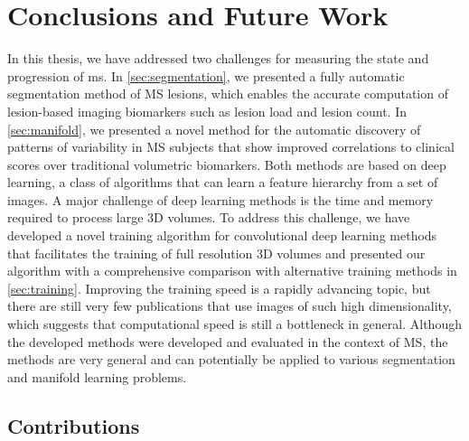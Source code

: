 \chapter{Conclusions and Future Work}
\label{sec:conclusions}

In this thesis, we have addressed two challenges for measuring the state and
progression of \gls{ms}. In \ref{sec:segmentation}, we presented a fully
automatic segmentation method of MS lesions, which enables the accurate
computation of lesion-based imaging biomarkers such as lesion load and lesion
count. In \ref{sec:manifold}, we presented a novel method for the automatic
discovery of patterns of variability in MS subjects that show improved
correlations to clinical scores over traditional volumetric biomarkers. Both
methods are based on deep learning, a class of algorithms that can learn a
feature hierarchy from a set of images. A major challenge of deep learning
methods is the time and memory required to process large 3D volumes. To address
this challenge, we have developed a novel training algorithm for convolutional
deep learning methods that facilitates the training of full resolution 3D
volumes and presented our algorithm with a comprehensive comparison with
alternative training methods in \ref{sec:training}. Improving the training speed
is a rapidly advancing topic, but there are still very few publications that use
images of such high dimensionality, which suggests that computational speed is
still a bottleneck in general. Although the developed methods were developed and
evaluated in the context of MS, the methods are very general and can potentially
be applied to various segmentation and manifold learning problems.

\section{Contributions}

